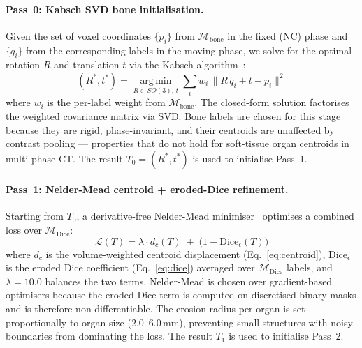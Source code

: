 \documentclass[10pt,twocolumn]{article}
\newcommand{\Mbone}{\mathcal{M}_{\text{bone}}}
\newcommand{\Mdice}{\mathcal{M}_{\text{Dice}}}
\begin{document}
\paragraph{Pass~0: Kabsch SVD bone initialisation.}
Given the set of voxel coordinates $\{p_i\}$ from $\Mbone$ in the
fixed (NC) phase and $\{q_i\}$ from the corresponding labels in the
moving phase, we solve for the optimal rotation $R$ and translation
$t$ via the Kabsch algorithm~\cite{kabsch1976}:
%
\begin{equation}
  (R^*, t^*) = \operatorname*{arg\,min}_{R \in SO(3),\, t}
  \sum_{i} w_i \,\bigl\| R\,q_i + t - p_i \bigr\|^2
  \label{eq:kabsch}
\end{equation}
%
where $w_i$ is the per-label weight from $\Mbone$.
The closed-form solution factorises the weighted covariance matrix via
SVD.
Bone labels are chosen for this stage because they are rigid,
phase-invariant, and their centroids are unaffected by contrast
pooling — properties that do not hold for soft-tissue organ centroids
in multi-phase CT.
The result $T_0 = (R^*, t^*)$ is used to initialise Pass~1.

\paragraph{Pass~1: Nelder-Mead centroid + eroded-Dice refinement.}
Starting from $T_0$, a derivative-free Nelder-Mead
minimiser~\cite{nelder1965} optimises a combined loss over $\Mdice$:
%
\begin{equation}
  \mathcal{L}(T) = \lambda \cdot d_c(T) \;+\;
  \bigl(1 - \text{Dice}_\epsilon(T)\bigr)
  \label{eq:pass1loss}
\end{equation}
%
where $d_c$ is the volume-weighted centroid displacement
(Eq.~\ref{eq:centroid}), $\text{Dice}_\epsilon$ is the eroded Dice
coefficient (Eq.~\ref{eq:dice}) averaged over $\Mdice$ labels,
and $\lambda = 10.0$ balances the two terms.
Nelder-Mead is chosen over gradient-based optimisers because the
eroded-Dice term is computed on discretised binary masks and is
therefore non-differentiable.
The erosion radius per organ is set proportionally to organ size
(2.0--6.0\,mm), preventing small structures with noisy boundaries
from dominating the loss.
The result $T_1$ is used to initialise Pass~2.
\end{document}

